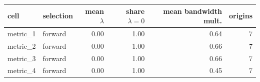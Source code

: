 \begin{tabular}{llrrrr}
\toprule
cell & selection & mean $\lambda$ & share $\lambda=0$ & mean bandwidth mult. & origins \\
\midrule
metric\_1 & forward & 0.00 & 1.00 & 0.64 & 7 \\
metric\_2 & forward & 0.00 & 1.00 & 0.66 & 7 \\
metric\_3 & forward & 0.00 & 1.00 & 0.66 & 7 \\
metric\_4 & forward & 0.00 & 1.00 & 0.45 & 7 \\
\bottomrule
\end{tabular}
